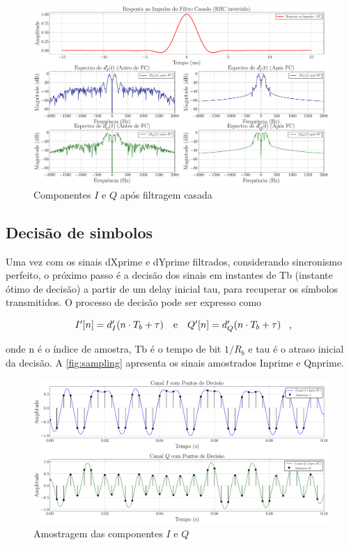 \begin{figure}[H]
	\centering
	\caption{Componentes $I$ e $Q$ após filtragem casada}\label{fig:matchedfilter}
	\includegraphics[width=\linewidth]{assets/cap2/matchedfilter.pdf}
\end{figure}


\subsection{Decisão de simbolos}

Uma vez com os sinais \gls{dXprime} e \gls{dYprime} filtrados, considerando sincronismo perfeito, o próximo passo é a decisão dos sinais em instantes de \gls{Tb} (instante ótimo de decisão) a partir de um delay inicial \gls{tau}, para recuperar os símbolos transmitidos. O processo de decisão pode ser expresso como

\vspace{-1em}
\begin{equation}
    \begin{array}{c@{\quad\text{e}\quad}c}
        I'[n] = d'_I(n \cdot T_b + \tau) & Q'[n] = d'_Q(n \cdot T_b + \tau)
    \end{array} \text{ ,}
\end{equation}

\noindent onde \gls{n} é o índice de amostra, \gls{Tb} é o tempo de bit $1/R_b$ e \gls{tau} é o atraso inicial da decisão. A \autoref{fig:sampling} apresenta os sinais amostrados \gls{Inprime} e \gls{Qnprime}. 

\begin{figure}[H]
	\centering
	\caption{Amostragem das componentes $I$ e $Q$}\label{fig:sampling}
	\includegraphics[width=\linewidth]{assets/cap2/sampling.pdf}
    
\end{figure}

